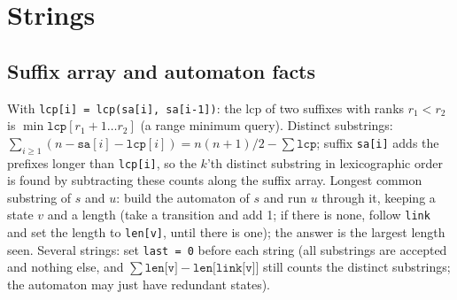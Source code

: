 \chapter{Strings}


\section{Suffix array and automaton facts}
	With \texttt{lcp[i] = lcp(sa[i], sa[i-1])}: the lcp of two suffixes with ranks $r_1 < r_2$ is $\min \texttt{lcp}[r_1+1 \ldots r_2]$ (a range minimum query).
	Distinct substrings: $\sum_{i \ge 1} (n - \texttt{sa}[i] - \texttt{lcp}[i]) = n(n+1)/2 - \sum \texttt{lcp}$; suffix \texttt{sa[i]} adds the prefixes longer than \texttt{lcp[i]},
	so the $k$'th distinct substring in lexicographic order is found by subtracting these counts along the suffix array.
	Longest common substring of $s$ and $u$: build the automaton of $s$ and run $u$ through it, keeping a state $v$ and a length (take a transition and add 1;
	if there is none, follow \texttt{link} and set the length to \texttt{len[v]}, until there is one); the answer is the largest length seen.
	Several strings: set \texttt{last = 0} before each string (all substrings are accepted and nothing else, and $\sum \texttt{len[v]} - \texttt{len[link[v]]}$ still counts the distinct substrings; the automaton may just have redundant states).
